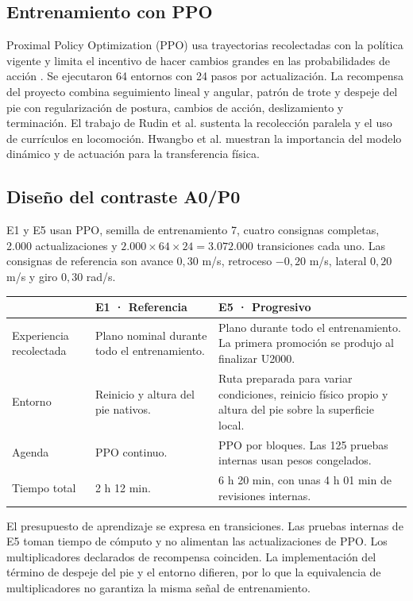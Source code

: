 \documentclass[11pt]{article}
\begin{document}
\subsection{Entrenamiento con PPO}
Proximal Policy Optimization (PPO) usa trayectorias recolectadas con la política vigente y limita el incentivo de hacer cambios grandes en las probabilidades de acción \cite{schulman2017}. Se ejecutaron 64 entornos con 24 pasos por actualización. La recompensa del proyecto combina seguimiento lineal y angular, patrón de trote y despeje del pie con regularización de postura, cambios de acción, deslizamiento y terminación. El trabajo de Rudin et al. \cite{rudin2022} sustenta la recolección paralela y el uso de currículos en locomoción. Hwangbo et al. \cite{hwangbo2019} muestran la importancia del modelo dinámico y de actuación para la transferencia física.

\newpage
\subsection{Diseño del contraste A0/P0}
E1 y E5 usan PPO, semilla de entrenamiento 7, cuatro consignas completas, 2.000 actualizaciones y \(2.000\times64\times24=3.072.000\) transiciones cada uno. Las consignas de referencia son avance \(0{,}30\) m/s, retroceso \(-0{,}20\) m/s, lateral \(0{,}20\) m/s y giro \(0{,}30\) rad/s.

\begin{tabularx}{\linewidth}{@{}p{.21\linewidth}LL@{}}
\toprule
 & \textbf{E1 · Referencia} & \textbf{E5 · Progresivo}\\
\midrule
Experiencia recolectada & Plano nominal durante todo el entrenamiento. & Plano durante todo el entrenamiento. La primera promoción se produjo al finalizar U2000.\\
Entorno & Reinicio y altura del pie nativos. & Ruta preparada para variar condiciones, reinicio físico propio y altura del pie sobre la superficie local.\\
Agenda & PPO continuo. & PPO por bloques. Las 125 pruebas internas usan pesos congelados.\\
Tiempo total & 2 h 12 min. & 6 h 20 min, con unas 4 h 01 min de revisiones internas.\\
\bottomrule
\end{tabularx}

El presupuesto de aprendizaje se expresa en transiciones. Las pruebas internas de E5 toman tiempo de cómputo y no alimentan las actualizaciones de PPO. Los multiplicadores declarados de recompensa coinciden. La implementación del término de despeje del pie y el entorno difieren, por lo que la equivalencia de multiplicadores no garantiza la misma señal de entrenamiento.
\end{document}
